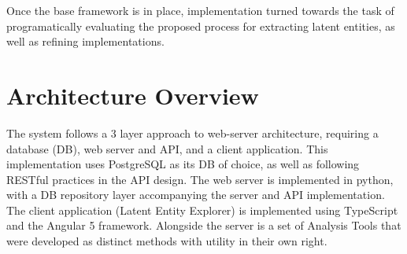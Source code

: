 \documentclass[10pt]{report}
\begin{document}
Once the base framework is in place, implementation turned towards the task of programatically evaluating the proposed process for extracting latent entities, as well as refining implementations.

\section{Architecture Overview}
The system follows a 3 layer approach to web-server architecture, requiring a database (DB), web server and API, and a client application. This implementation uses PostgreSQL as its DB of choice, as well as following RESTful practices in the API design. The web server is implemented in python, with a DB repository layer accompanying the server and API implementation. The client application (Latent Entity Explorer) is implemented using TypeScript and the Angular 5 framework. Alongside the server is a set of Analysis Tools that were developed as distinct methods with utility in their own right.
\end{document}
